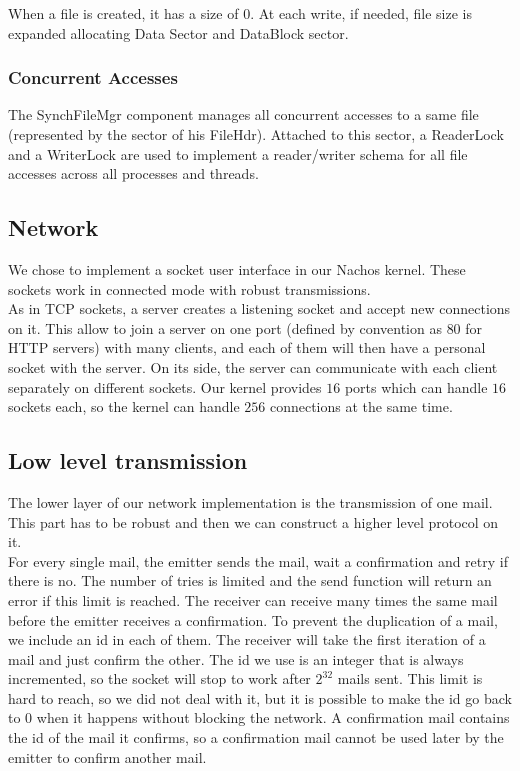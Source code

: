 When a file is created, it has a size of $0$. At each write, if needed, file size is
expanded allocating Data Sector and DataBlock sector.

\subsubsection{Concurrent Accesses}
The SynchFileMgr component manages all concurrent accesses to a same file
(represented by the sector of his FileHdr). Attached to this sector, a
ReaderLock and a WriterLock are used to implement a reader/writer schema for
all file accesses across all processes and threads.

\subsection{Network}
We chose to implement a socket user interface in our Nachos kernel. These
sockets work in connected mode with robust transmissions.\\
As in TCP sockets, a server creates a listening socket and accept new
connections on it. This allow to join a server on one port (defined by
convention as $80$ for HTTP servers) with many clients, and each of them will then
have a personal socket with the server.
On its side, the server can communicate with each client separately on
different sockets. Our kernel provides $16$ ports which can handle $16$ sockets
each, so the kernel can handle $256$ connections at the same time.

\subsection{Low level transmission}
The lower layer of our network implementation is the transmission of one mail.
This part has to be robust and then we can construct a higher level protocol
on it.\\
For every single mail, the emitter sends the mail, wait a confirmation and retry
if there is no. The number of tries is limited and the send function will return an
error if this limit is reached.
The receiver can receive many times the same mail before the emitter receives a
confirmation. To prevent the duplication of a mail, we include an id in each of
them. The receiver will take the first iteration of a mail and just confirm the
other. The id we use is an integer that is always incremented, so the socket will stop
to work after $2^{32}$ mails sent. This limit is hard to reach, so we did not
deal with it, but it is possible to make the id go back to $0$ when it happens
without blocking the network.
A confirmation mail contains the id of the mail it confirms, so a confirmation
mail cannot be used later by the emitter to confirm another mail.

